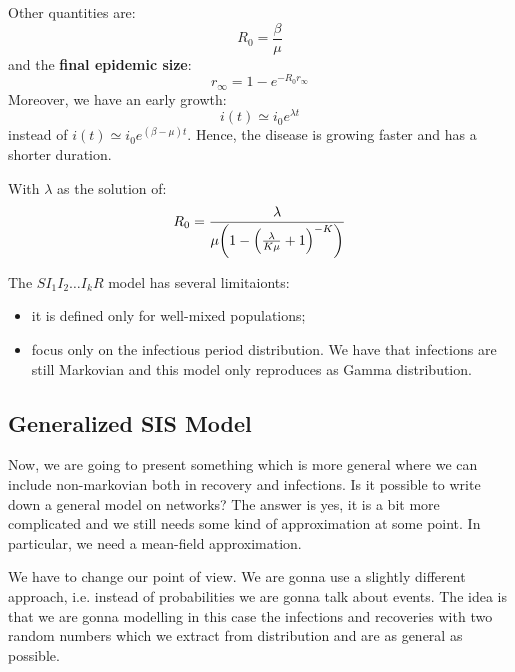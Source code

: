\documentclass[../main/main.tex]{subfiles}
\begin{document}
Other quantities are:
\begin{equation*}
  R_0 = \frac{\beta }{\mu }
\end{equation*}
and the \textbf{final epidemic size}:
\begin{equation*}
  r_ \infty  = 1 - e^{- R_0 r_ \infty }
\end{equation*}
Moreover, we have an early growth:
\begin{equation*}
  i(t) \simeq i_0 e^{\lambda t}
\end{equation*}
instead of \( i(t) \simeq i_0 e^{(\beta - \mu )t}  \). Hence, the disease is growing faster and has a shorter duration.

With \( \lambda  \) as the solution of:
\begin{equation*}
  R_0 = \frac{\lambda }{\mu  \qty(1- \qty(\frac{\lambda }{K \mu } + 1) ^{-K}) }
\end{equation*}

The \( S I_1 I_2 \dots I_k R \) model has several limitaionts:
\begin{itemize}
\item it is defined only for well-mixed populations;
\item focus only on the infectious period distribution. We have that infections are still Markovian and this model only reproduces as Gamma distribution.
\end{itemize}


\subsection{Generalized SIS Model}

Now, we are going to present something which is more general where we can include non-markovian both in recovery and infections.
Is it possible to write down a general model on networks? The answer is  yes, it is a bit more complicated and we still needs some kind of approximation at some point.
In particular, we need a mean-field approximation.

We have to change our point of view. We are gonna use a slightly different approach, i.e. instead of probabilities we are gonna talk about events. The idea is that we are gonna modelling in this case the infections and recoveries with two random numbers which we extract from distribution and are as general as possible.
\end{document}
